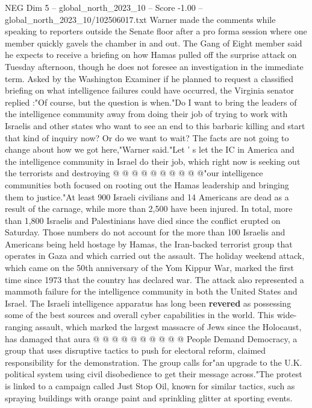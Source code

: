 \begin{textsample}{NEG Dim 5 – global\_north\_2023\_10 – Score -1.00 – global\_north\_2023\_10/102506017.txt}  \label{ex:f5_neg_026}
Warner made the comments while speaking to reporters outside the Senate floor after a pro forma session where one member quickly gavels the chamber in and out.
The Gang of Eight member said he expects to receive a briefing on how Hamas pulled off the surprise attack on Tuesday afternoon, though he does not foresee an investigation in the immediate term.
Asked by the Washington Examiner if he planned to request a classified briefing on what intelligence failures could have occurred, the Virginia senator replied :"Of course, but the question is when."Do I want to bring the leaders of the intelligence community away from doing their job of trying to work with Israelis and other states who want to see an end to this barbaric killing and start that kind of inquiry now?
Or do we want to wait?
The facts are not going to change about how we got here,"Warner said."Let ' s let the IC in America and the intelligence community in Israel do their job, which right now is seeking out the terrorists and destroying @ @ @ @ @ @ @ @ @ @"our intelligence communities both focused on rooting out the Hamas leadership and bringing them to justice."At least 900 Israeli civilians and 14 Americans are dead as a result of the carnage, while more than 2,500 have been injured.
In total, more than 1,800 Israelis and Palestinians have died since the conflict erupted on Saturday.
Those numbers do not account for the more than 100 Israelis and Americans being held hostage by Hamas, the Iran-backed terrorist group that operates in Gaza and which carried out the assault.
The holiday weekend attack, which came on the 50th anniversary of the Yom Kippur War, marked the first time since 1973 that the country has declared war.
The attack also represented a mammoth failure for the intelligence community in both the United States and Israel.
The Israeli intelligence apparatus has long been \textbf{revered} as possessing some of the best sources and overall cyber capabilities in the world.
This wide-ranging assault, which marked the largest massacre of Jews since the Holocaust, has damaged that aura @ @ @ @ @ @ @ @ @ @ People Demand Democracy, a group that uses disruptive tactics to push for electoral reform, claimed responsibility for the demonstration.
The group calls for"an upgrade to the U.K. political system using civil disobedience to get their message across."The protest is linked to a campaign called Just Stop Oil, known for similar tactics, such as spraying buildings with orange paint and sprinkling glitter at sporting events.

\end{textsample}
